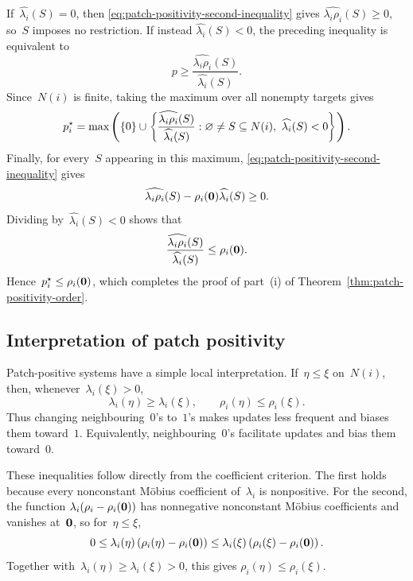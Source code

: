 If~$\widehat{\lambda_i}(S)=0$, then
\eqref{eq:patch-positivity-second-inequality} gives
$\widehat{\lambda_i\rho_i}(S)\geq0$, so~$S$ imposes no restriction. If instead
$\widehat{\lambda_i}(S)<0$, the preceding inequality is equivalent to
\begin{equation*}
p
\geq
\frac{\widehat{\lambda_i\rho_i}(S)}{\widehat{\lambda_i}(S)}.
\end{equation*}
Since~$N(i)$ is finite, taking the maximum over all nonempty targets gives
\begin{equation*}
p_i^\star
=
\max\left(
\left\{0\right\}
\cup
\left\{
\frac{\widehat{\lambda_i\rho_i}(S)}{\widehat{\lambda_i}(S)}:
\varnothing\neq S\subseteq N(i),\ \widehat{\lambda_i}(S)<0
\right\}
\right).
\end{equation*}
Finally, for every~$S$ appearing in this maximum,
\eqref{eq:patch-positivity-second-inequality} gives
\begin{equation*}
\widehat{\lambda_i\rho_i}(S)
-\rho_i(\mathbf{0})\widehat{\lambda_i}(S)
\geq0.
\end{equation*}
Dividing by~$\widehat{\lambda_i}(S)<0$ shows that
\begin{equation*}
\frac{\widehat{\lambda_i\rho_i}(S)}{\widehat{\lambda_i}(S)}
\leq
\rho_i(\mathbf{0}).
\end{equation*}
Hence~$p_i^\star\leq\rho_i(\mathbf{0})$, which completes the proof of
part~\textup{(i)} of Theorem~\ref{thm:patch-positivity-order}.

\subsection{Interpretation of patch positivity}
\label{subsec:positivity-interpretation}

Patch-positive systems have a simple local interpretation. If~$\eta\leq\xi$
on~$N(i)$, then, whenever~$\lambda_i(\xi)>0$,
\begin{equation*}
\lambda_i(\eta)\geq\lambda_i(\xi),
\qquad
\rho_i(\eta)\leq\rho_i(\xi).
\end{equation*}
Thus changing neighbouring~$0$'s to~$1$'s makes updates less frequent and
biases them toward~$1$. Equivalently, neighbouring~$0$'s facilitate updates and
bias them toward~$0$.

These inequalities follow directly from the coefficient criterion. The first
holds because every nonconstant M\"obius coefficient of~$\lambda_i$ is
nonpositive. For the second, the function
$\lambda_i(\rho_i-\rho_i(\mathbf{0}))$ has nonnegative nonconstant M\"obius
coefficients and vanishes at~$\mathbf{0}$, so for~$\eta\leq\xi$,
\begin{equation*}
0
\leq
\lambda_i(\eta)\left(\rho_i(\eta)-\rho_i(\mathbf{0})\right)
\leq
\lambda_i(\xi)\left(\rho_i(\xi)-\rho_i(\mathbf{0})\right).
\end{equation*}
Together with~$\lambda_i(\eta)\geq\lambda_i(\xi)>0$, this gives
$\rho_i(\eta)\leq\rho_i(\xi)$.

